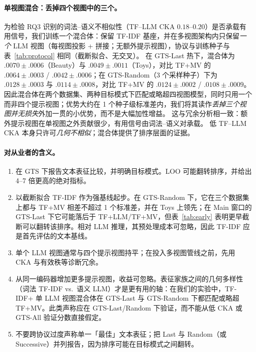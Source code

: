 \documentclass[sigconf,natbib=true,anonymous]{acmart}
\newcommand{\tfidf}{\textsc{TF-IDF}\xspace}
\newcommand{\llm}{\textsc{LLM}\xspace}
\newcommand{\tfllm}{\textsc{TF+LLM}\xspace}
\newcommand{\tfmv}{\textsc{TF+MV}\xspace}
\begin{document}
\paragraph{单视图混合：丢掉四个视图中的三个。}
为检验 RQ3 识别的词法--语义不相似性（TF--LLM CKA $0.18$--$0.20$）是否承载有用信号，我们训练一个混合体：保留 \tfidf 基座，并在多视图架构内只保留\emph{一个} LLM 视图（每视图投影 + 拼接；无额外提示视图），协议与训练种子与表~\ref{tab:protocol} 相同（截断拟合、无交叉）。
在 GTS-Last 热下，混合体为 $.0070\pm.0006$（Beauty）与 $.0049\pm.0011$（Toys），对比 \tfmv 的 $.0064\pm.0003$ / $.0042\pm.0006$；在 GTS-Random（3 个采样种子）下为 $.0128\pm.0003$ 与 $.0114\pm.0008$，对比 \tfmv 的 $.0124\pm.0002$ / $.0108\pm.0009$。
因此混合体在两个数据集、两种目标模式下匹配或略超四视图模型，同时只用一个而非四个提示视图；优势大约在 1 个种子级标准差内，我们将其读作\emph{丢掉三个视图并无损失}外加一贯的小优势，而不是大幅加性增益。
这与冗余分析相一致：额外提示视图在单视图之外贡献很少，有用信号由词法--语义对承载。
低 TF--LLM CKA 本身只许可\emph{几何不相似}；混合体提供了排序层面的证据。

\paragraph{对从业者的含义。}
\begin{enumerate}[leftmargin=*,itemsep=2pt]
\item 在 GTS 下报告文本表征比较，并明确目标模式。LOO 可能翻转排序，并给出 4--7 倍更高的绝对指标。
\item 以截断拟合 \tfidf 作为强基线起步。在 GTS-Random 下，它在三个数据集上都与 \tfmv 相差不超过 1 个标准差，并在 Toys 上领先；在 Main 窗口的 GTS-Last 下它可能落后于 \tfllm/\tfmv，但表~\ref{tab:early} 表明更早截断可以翻转该排序。相对 LLM 推理，其预处理成本可忽略，因此 TF-IDF 应是首先评估的文本基线。
\item 单个 \llm 视图通常与四个提示视图持平；在投入多视图管线之前，先用 CKA 与有效秩等诊断冗余。
\item 从同一编码器增加更多提示视图，收益可忽略。表征家族之间的几何多样性（词法 \tfidf vs.\ 语义 \llm）才是更有用的轴：在我们的实验中，\tfidf + 单 LLM 视图混合体在 GTS-Last 与 GTS-Random 下都匹配或略超 \tfmv。此类声称应在 GTS-Last/Random 下验证，而不能从低 CKA 或 GTS-All 验证分数直接假定。
\item 不要跨协议过度声称单一「最佳」文本表征；把 Last 与 Random（或 Successive）并列报告，因为排序可能在目标模式之间翻转。
\end{enumerate}
\end{document}
